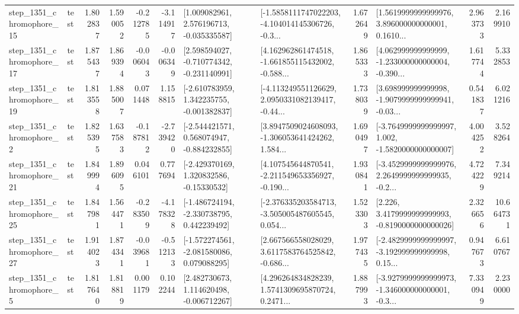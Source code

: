 \begin{tabular}{llrrrrllrlrr}
 step\_1351\_chromophore\_15 &      test &      1.802837 &    1.590052 &     -0.212785 & -3.114917 &    [1.009082961, 2.576196713, -0.035335587] &  [-1.5858111747022203, -4.104014145306726, -0.3... &       1.672649 &  [1.5619999999999976, 3.896000000000001, 0.1610... &            2.963733 &          2.169910 \\
 step\_1351\_chromophore\_17 &      test &      1.875437 &    1.869394 &     -0.006043 & -0.006349 &   [2.598594027, -0.710774342, -0.231140991] &  [4.162962861474518, -1.661855115432002, -0.588... &       1.865333 &  [4.062999999999999, -1.233000000000004, -0.390... &            1.617744 &          5.332853 \\
 step\_1351\_chromophore\_19 &      test &      1.813558 &    1.885007 &      0.071448 &  1.158815 &   [-2.610783959, 1.342235755, -0.001382837] &  [-4.113249551126629, 2.0950331082139417, -0.44... &       1.738039 &  [3.698999999999998, -1.9079999999999941, -0.03... &            0.541837 &          6.021216 \\
  step\_1351\_chromophore\_2 &      test &      1.825395 &    1.637583 &     -0.187812 & -2.739420 &   [-2.544421571, 0.568074947, -0.884232855] &  [3.8947509024608093, -1.306053641424262, 1.584... &       1.690497 &  [-3.7649999999999997, 1.002, -1.5820000000000007] &            4.004252 &          3.528264 \\
 step\_1351\_chromophore\_21 &      test &      1.849994 &    1.896095 &      0.046101 &  0.777694 &    [-2.429370169, 1.320832586, -0.15330532] &  [4.107545644870541, -2.211549653356927, -0.190... &       1.930841 &  [-3.4529999999999976, 2.2649999999999935, -0.2... &            4.724229 &          7.349214 \\
 step\_1351\_chromophore\_25 &      test &      1.847981 &    1.564471 &     -0.283509 & -4.178328 &   [-1.486724194, -2.330738795, 0.442239492] &  [-2.376335203584713, -3.505005487605545, 0.054... &       1.523303 &   [2.226, 3.4179999999999993, -0.8190000000000026] &            2.326656 &         10.664731 \\
 step\_1351\_chromophore\_27 &      test &      1.914023 &    1.874341 &     -0.039681 & -0.512133 &   [-1.572274561, -2.081580086, 0.079088295] &  [2.667566558028029, 3.6117583764525842, -0.686... &       1.977435 &  [-2.4829999999999997, -3.192999999999998, 0.15... &            0.947673 &          6.610767 \\
  step\_1351\_chromophore\_5 &      test &      1.817640 &    1.818819 &      0.001179 &  0.102244 &    [2.482730673, 1.114620498, -0.006712267] &  [4.296264834828239, 1.5741309695870724, 0.2471... &       1.887993 &  [-3.9279999999999973, -1.346000000000001, -0.3... &            7.330949 &          2.230000 \\

\end{tabular}
